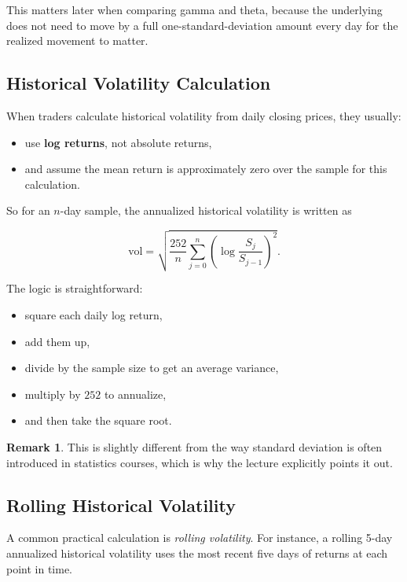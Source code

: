 \documentclass[11pt]{article}
\theoremstyle{definition}
\newtheorem{remark}{Remark}[section]
\begin{document}
This matters later when comparing gamma and theta, because the underlying does not need to move by a full one-standard-deviation amount every day for the realized movement to matter.

\subsection{Historical Volatility Calculation}

When traders calculate historical volatility from daily closing prices, they usually:

\begin{itemize}
    \item use \textbf{log returns}, not absolute returns,
    \item and assume the mean return is approximately zero over the sample for this calculation.
\end{itemize}

So for an \(n\)-day sample, the annualized historical volatility is written as

\[
\text{vol} = \sqrt{\frac{252}{n}\sum_{j=0}^{n}\left(\log\frac{S_j}{S_{j-1}}\right)^2 }.
\]

The logic is straightforward:
\begin{itemize}
    \item square each daily log return,
    \item add them up,
    \item divide by the sample size to get an average variance,
    \item multiply by \(252\) to annualize,
    \item and then take the square root.
\end{itemize}

\begin{remark}
This is slightly different from the way standard deviation is often introduced in statistics courses, which is why the lecture explicitly points it out.
\end{remark}

\subsection{Rolling Historical Volatility}

A common practical calculation is \emph{rolling volatility}. For instance, a rolling 5-day annualized historical volatility uses the most recent five days of returns at each point in time.
\end{document}
